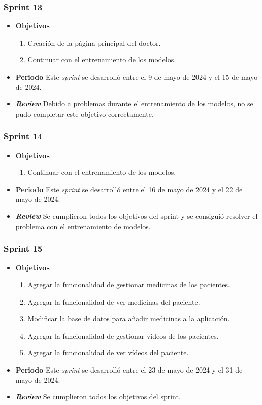 \subsubsection{Sprint 13}
\begin{itemize}
\item \textbf{Objetivos}
\begin{enumerate}
\item Creación de la página principal del doctor.
\item Continuar con el entrenamiento de los modelos.
\end{enumerate}
\item \textbf{Periodo}
Este \textsl{sprint} se desarrolló entre el 9 de mayo de 2024 y el 15 de mayo de 2024.
\item \textbf{\textsl{Review}}
Debido a problemas durante el entrenamiento de los modelos, no se pudo completar este objetivo correctamente. 
\end{itemize}

\subsubsection{Sprint 14}
\begin{itemize}
\item \textbf{Objetivos}
\begin{enumerate}
\item Continuar con el entrenamiento de los modelos.
\end{enumerate}
\item \textbf{Periodo}
Este \textsl{sprint} se desarrolló entre el 16 de mayo de 2024 y el 22 de mayo de 2024.
\item \textbf{\textsl{Review}}
Se cumplieron todos los objetivos del sprint y se consiguió resolver el problema con el entrenamiento de modelos.
\end{itemize}

\subsubsection{Sprint 15}
\begin{itemize}
\item \textbf{Objetivos}
\begin{enumerate}
\item Agregar la funcionalidad de gestionar medicinas de los pacientes.
\item Agregar la funcionalidad de ver medicinas del paciente.
\item Modificar la base de datos para añadir medicinas a la aplicación.
\item Agregar la funcionalidad de gestionar vídeos de los pacientes.
\item Agregar la funcionalidad de ver vídeos del paciente.
\end{enumerate}
\item \textbf{Periodo}
Este \textsl{sprint} se desarrolló entre el 23 de mayo de 2024 y el 31 de mayo de 2024.
\item \textbf{\textsl{Review}}
Se cumplieron todos los objetivos del sprint.
\end{itemize}

